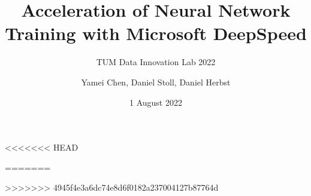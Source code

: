 \documentclass[12pt, aspectratio=169]{beamer}
\title{Acceleration of Neural Network Training with Microsoft DeepSpeed}
\subtitle{TUM Data Innovation Lab 2022}
\author{Yamei Chen, Daniel Stoll, Daniel Herbst}
\date{1 August 2022}
\begin{document}
	
	\begin{frame}[plain]
		\maketitle
	\end{frame}

	\begin{frame}
		\tableofcontents
	\end{frame}

	
	
	
	
<<<<<<< HEAD
	
=======
	
>>>>>>> 4945f4e3a6dc74e8d6f0182a237004127b87764d
\end{document}
